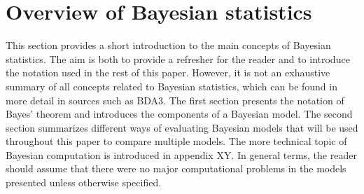 \section{Overview of Bayesian statistics}

This section provides a short introduction to the main concepts of Bayesian statistics.
The aim is both to provide a refresher for the reader and to introduce the notation used in the rest of this paper.
However, it is not an exhaustive summary of all concepts related to Bayesian statistics, which can be found in more detail in sources such as BDA3.
The first section presents the notation of Bayes' theorem and introduces the components of a Bayesian model.
The second section summarizes different ways of evaluating Bayesian models that will be used throughout this paper to compare multiple models.
The more technical topic of Bayesian computation is introduced in appendix XY.
In general terms, the reader should assume that there were no major computational problems in the models presented unless otherwise specified.




